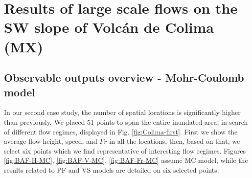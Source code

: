 \documentclass{article}
\begin{document}
\newpage
\section{Results of large scale flows on the SW slope of Volc{\'a}n de Colima (MX)}\label{QoI2}
\subsection{Observable outputs overview - Mohr-Coulomb model}
In our second case study, the number of spatial locations is significantly higher than previously. We placed 51 points to span the entire inundated area, in search of different flow regimes, displayed in Fig. \ref{fig:Colima-first}. First we show the average flow height, speed, and $Fr$ in all the locations, then, based on that, we select six points which we find representative of interesting flow regimes. Figures \ref{fig:BAF-H-MC}, \ref{fig:BAF-V-MC}, \ref{fig:BAF-Fr-MC} assume MC model, while the results related to PF and VS models are detailed on six selected points.
\end{document}
